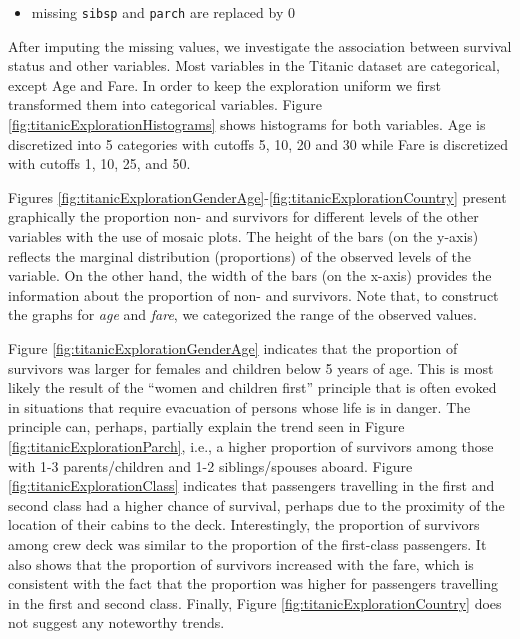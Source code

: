 \documentclass[]{krantz}
\newenvironment{Shaded}{\begin{snugshade}}{\end{snugshade}}
\newcommand{\DecValTok}[1]{\textcolor[rgb]{0.00,0.00,0.81}{#1}}
\newcommand{\KeywordTok}[1]{\textcolor[rgb]{0.13,0.29,0.53}{\textbf{#1}}}
\newcommand{\NormalTok}[1]{#1}
\newcommand{\OperatorTok}[1]{\textcolor[rgb]{0.81,0.36,0.00}{\textbf{#1}}}
\newcommand{\StringTok}[1]{\textcolor[rgb]{0.31,0.60,0.02}{#1}}
\providecommand{\tightlist}{%
  \setlength{\itemsep}{0pt}\setlength{\parskip}{0pt}}
\begin{document}
\begin{itemize}
\tightlist
\item
  missing \texttt{sibsp} and \texttt{parch} are replaced by 0
\end{itemize}

\begin{Shaded}
\end{Shaded}

After imputing the missing values, we investigate the association between survival status and other variables. Most variables in the Titanic dataset are categorical, except Age and Fare. In order to keep the exploration uniform we first transformed them into categorical variables. Figure \ref{fig:titanicExplorationHistograms} shows histograms for both variables. Age is discretized into 5 categories with cutoffs 5, 10, 20 and 30 while Fare is discretized with cutoffs 1, 10, 25, and 50.

Figures \ref{fig:titanicExplorationGenderAge}-\ref{fig:titanicExplorationCountry} present graphically the proportion non- and survivors for different levels of the other variables with the use of mosaic plots. The height of the bars (on the y-axis) reflects the marginal distribution (proportions) of the observed levels of the variable. On the other hand, the width of the bars (on the x-axis) provides the information about the proportion of non- and survivors. Note that, to construct the graphs for \emph{age} and \emph{fare}, we categorized the range of the observed values.

Figure \ref{fig:titanicExplorationGenderAge} indicates that the proportion of survivors was larger for females and children below 5 years of age. This is most likely the result of the ``women and children first'' principle that is often evoked in situations that require evacuation of persons whose life is in danger. The principle can, perhaps, partially explain the trend seen in Figure \ref{fig:titanicExplorationParch}, i.e., a higher proportion of survivors among those with 1-3 parents/children and 1-2 siblings/spouses aboard. Figure \ref{fig:titanicExplorationClass} indicates that passengers travelling in the first and second class had a higher chance of survival, perhaps due to the proximity of the location of their cabins to the deck. Interestingly, the proportion of survivors among crew deck was similar to the proportion of the first-class passengers. It also shows that the proportion of survivors increased with the fare, which is consistent with the fact that the proportion was higher for passengers travelling in the first and second class. Finally, Figure \ref{fig:titanicExplorationCountry} does not suggest any noteworthy trends.
\end{document}
